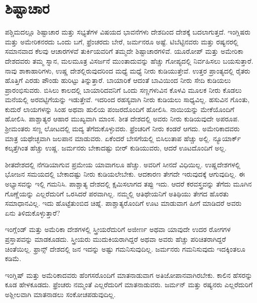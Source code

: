 \newpage

\section*{ಶಿಷ್ಟಾಚಾರ}

ಪಶ್ಚಿಮದಲ್ಲೂ ಶಿಷ್ಟಾಚಾರ ಮತ್ತು ಸಭ್ಯತೆಗಳ ವಿಷಯದ ಭಾವನೆಗಳು ದೇಶದಿಂದ ದೇಶಕ್ಕೆ ಬದಲಾಗುತ್ತದೆ. ಇಂಗ್ಲಿಷರು ಮತ್ತು ಅಮೇರಿಕನರದು ಒಂದು ಬಗೆ, ಫ್ರೆಂಚರದು ಬೇರೆ, ಜರ್ಮನರೂ ಅಷ್ಟೆ. ಟಿಬೆಟ್ಟಿನವರು ಮತ್ತು ರಷ್ಯನರಲ್ಲಿ ಸಮಾನವಾದ ಕೆಲವು ಆಚಾರಗಳವೆ ತುರ್ಕಿಯವರಿಗೆ ತಮ್ಮದೇ ಶಿಷ್ಟಾಚಾರಗಳಿವೆ. ಯೂರೋಪ್​ ಮತ್ತು ಅಮೇರಿಕಾ ದೇಶದವರು ತಮ್ಮ ಸ್ನಾನ, ಮಲಮೂತ್ರ ವಿಸರ್ಜನೆ ಮುಂತಾದುವನ್ನು ಹೆಚ್ಚು ಗೋಪ್ಯದಲ್ಲಿ ನಿರ್ವಹಿಸಲು ಬಯಸುತ್ತಾರೆ. ನಾವು ಶಾಕಾಹಾರಿಗಳು, ಉಷ್ಣ ದೇಶಲ್ಲಿರುವುದರಿಂದ ಮಧ್ಯೆ ಮಧ್ಯೆ ನೀರು ಕುಡಿಯುತ್ತೇವೆ. ಉತ್ತರ ಪ್ರಾಂತ್ಯದಲ್ಲಿ ರೈತರು ಹೊತ್ತಿಗೆ ಎರಡು ಪೌಂಡು ಹುರಿಟ್ಟು ತಿನ್ನುತ್ತಾರೆ. ಬಾಯಾರಿಕೆ ಆದಂತೆ ಬಾವಿಯಿಂದ ನೀರು ಸೇದಿ ಕುಡಿಯಲು ಪ್ರಾರಂಭಿಸುವರು. ಬಿಸಿಲು ಕಾಲದಲ್ಲಿ ಬಾಯಾರಿದವನಿಗೆ ಒಂದು ಸಣ್ಣಗಳುವಿನ ಕೊಳವಿ ಮೂಲಕ ನೀರು ಕೊಡಲು ಮನೆಯಲ್ಲಿ ಅರವಟ್ಟಿಗೆಯನ್ನು ಇಡುತ್ತೇವೆ. ಇದರಿಂದ ರಹಸ್ಯವಾಗಿ ನೀರು ಕುಡಿಯಲು ಸಾಧ್ಯವಿಲ್ಲ. ಹಸುವಿನ ಗೊಂತು, ಕುದುರೆ ಲಾಯಗಳನ್ನು ಸಿಂಹ ಅಥವಾ ಹುಲಿಯ ಪಂಜರದೊಂದಿಗೆ ಹೋಲಿಸಿ. ನಾಯಿಯನ್ನು ಮೇಕೆಯೊಂದಿಗೆ ಹೋಲಿಸಿ. ಪಾಶ್ಚಾತ್ಯರ ಆಹಾರ ಮುಖ್ಯವಾಗಿ ಮಾಂಸ. ಶೀತ ದೇಶದಲ್ಲಿ ಅವರು ನೀರು ಕುಡಿಯವುದೇ ಅಪರೂಪ. ಶ‍್ರೀಮಂತರು ಸಣ್ಣ ಲೋಟದಲ್ಲಿ ಮದ್ಯ ತೆಗೆದುಕೊಳ್ಳುವರು. ಫ್ರೆಂಚರಿಗೆ ನೀರು ಕಂಡರೆ ಆಗದು. ಅಮೇರಿಕಾದವರು ಮಾತ್ರ ಯಥೇಚ್ಛವಾಗಿ ಜಲಪಾನ ಮಾಡುವರು. ಏಕೆಂದರೆ ಬೇಸಗೆಯಲ್ಲಿ ಬಿಸಿಲುತಾಪ ಹೆಚ್ಚು ಅಲ್ಲಿ. ನ್ಯೂಯಾರ್ಕ್ ಕಲ್ಕತ್ತೆಗಿಂತ ಹೆಚ್ಚು ಉಷ್ಣ. ಜರ್ಮನರು ಬೇಕಾದಷ್ಟು ಬೀರ್​ ಕುಡಿಯುವರು, ಆದರೆ ಊಟದೊಂದಿಗೆ ಅಲ್ಲ.

\vskip 8pt

ಶೀತದೇಶದಲ್ಲಿ ನೆಗಡಿಯಾಗುವ ಪ್ರಮೇಯ ಯಾವಾಗಲೂ ಹೆಚ್ಚು. ಅವರಿಗೆ ಸೀನದೆ ವಿಧಿಯಿಲ್ಲ. ಉಷ್ಣದೇಶಗಳಲ್ಲಿ ಭೋಜನ ಸಮಯದಲ್ಲಿ ಬೇಕಾದಷ್ಟು ನೀರು ಕುಡಿಯಲೇ\break ಬೇಕು. ಆದಕಾರಣ ತೇಗದೇ ಇರುವುದಕ್ಕೆ ಆಗುವುದಿಲ್ಲ. ಈ ಅಭ್ಯಾಸವನ್ನು ಇಲ್ಲಿ ಗಮನಿಸಿ. ಪಾಶ್ಚಾತ್ಯ ದೇಶದಲ್ಲಿ ಕ್ಷಮಿಸಲಾಗದ ತಪ್ಪು ಇದು. ಆದರೆ ಕರವಸ್ತ್ರವನ್ನು ತೆಗೆದು ಮೂಗಿನ ಗೊಣ್ಣೆಯನ್ನು ಎಲ್ಲರೆದುರಿಗೆ ಒರಸಿದರೆ ಪರವಾಗಿಲ್ಲ. ನಮ್ಮಲ್ಲಿ ಆತಿಥೇಯನಿಗೆ ಅತಿಥಿಯು ತೇಗದ ಹೊರತು ಸಮಾಧಾನವಿಲ್ಲ. ಇದು ಹೊಟ್ಟೆತುಂಬಿದ ಚಿಹ್ನೆ. ಪಾಶ್ಚಾತ್ಯರೊಂದಿಗೆ ಊಟ ಮಾಡುವಾಗ ಹೀಗೆ ಮಾಡಿದರೆ ಅವರು ಏನು ತಿಳಿದುಕೊಳ್ಳುತ್ತಾರೆ?

\vskip 8pt

ಇಂಗ್ಲೆಂಡ್​ ಮತ್ತು ಅಮೆರಿಕಾ ದೇಶಗಳಲ್ಲಿ ಸ್ತ್ರೀಯರೆದುರಿಗೆ ಅಜೀರ್ಣ ಅಥವಾ ಯಾವುದೇ ಉದರ ರೋಗಗಳ ಪ್ರಸ್ತಾಪವನ್ನು ಮಾಡಕೂಡದು. ಸ್ತ್ರೀಯರು ಮುದುಕಿಯ\break ರಾಗಿದ್ದರೆ ಅಥವಾ ಅವರು ಹೆಚ್ಚು ಪರಿಚಿತರಾಗಿದ್ದರೆ ಚಿಂತೆಯಿಲ್ಲ. ಫ್ರಾನ್ಸ್​ ದೇಶದಲ್ಲಿ ಜನ ಇದನ್ನು ಅಷ್ಟು ಗಮನಿಸುವುದಿಲ್ಲ. ಜರ್ಮನರು ಗಮನಿಸುವುದು ಇದಕ್ಕಿಂತಲೂ ಕಡಿಮೆ.

\eject

ಇಂಗ್ಲಿಷ್​ ಮತ್ತು ಅಮೆರಿಕಾದವರು ಹೆಂಗಸರೊಂದಿಗೆ ಮಾತನಾಡುವಾಗ ಅತಿ\break ಜೋಪಾನವಾಗಿರಬೇಕು. ಕಾಲಿನ ಹೆಸರನ್ನು ಕೂಡ ಹೇಳಕೂಡದು. ಫ್ರೆಂಚರು ನಮ್ಮಂತೆ ಎಲ್ಲರೆದುರಿಗೆ ಮಾತನಾಡುವರು. ಜರ್ಮನ್​ ಮತ್ತು ರಷ್ಯನರು ಎಲ್ಲರೆದುರಿಗೆ ಅಶ್ಲೀಲವಾಗಿ ಮಾತನಾಡಲು ಸಂಕೋಚಪಡುವುದಿಲ್ಲ.

